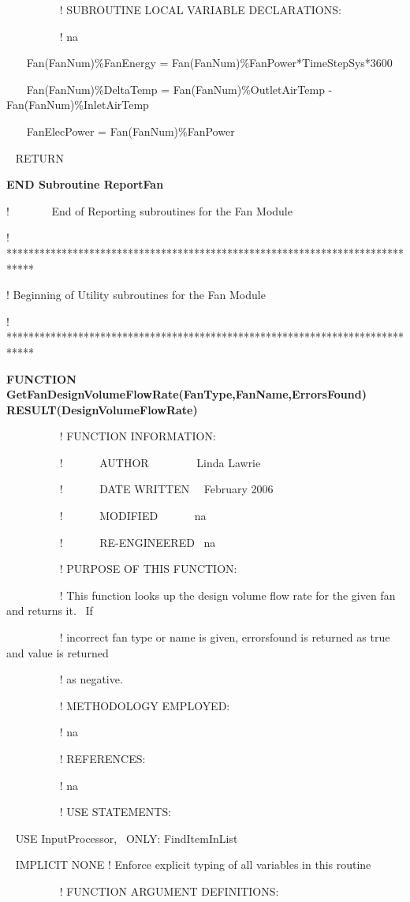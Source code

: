 ~~~~~~~~~ ! SUBROUTINE LOCAL VARIABLE DECLARATIONS:

~~~~~~~~~ ! na

~~~ Fan(FanNum)\%FanEnergy = Fan(FanNum)\%FanPower*TimeStepSys*3600

~~~ Fan(FanNum)\%DeltaTemp = Fan(FanNum)\%OutletAirTemp - Fan(FanNum)\%InletAirTemp

~~~ FanElecPower = Fan(FanNum)\%FanPower

~ RETURN

\textbf{END Subroutine ReportFan}

!~~~~~~~ End of Reporting subroutines for the Fan Module

! *****************************************************************************

! Beginning of Utility subroutines for the Fan Module

! *****************************************************************************

\textbf{FUNCTION GetFanDesignVolumeFlowRate(FanType,FanName,ErrorsFound) RESULT(DesignVolumeFlowRate)}

~~~~~~~~~ ! FUNCTION INFORMATION:

~~~~ ~~~~~!~~~~~~ AUTHOR~~~~~~~~ Linda Lawrie

~~~~~~~~~ !~~~~~~ DATE WRITTEN~~ February 2006

~~~~~~~~~ !~~~~~~ MODIFIED~~~~~~ na

~~~~~~~~~ !~~~~~~ RE-ENGINEERED~ na

~~~~~~~~~ ! PURPOSE OF THIS FUNCTION:

~~~~~~~~~ ! This function looks up the design volume flow rate for the given fan and returns it.~ If

~~~~~~~~~ ! incorrect fan type or name is given, errorsfound is returned as true and value is returned

~~~~~~~~~ ! as negative.

~~~~~~~~~ ! METHODOLOGY EMPLOYED:

~~~~~~~~~ ! na

~~~~~~~~~ ! REFERENCES:

~~~~~~~~ ~! na

~~~~~~~~~ ! USE STATEMENTS:

~ USE InputProcessor,~ ONLY: FindItemInList

~ IMPLICIT NONE ! Enforce explicit typing of all variables in this routine

~~~~~~~~~ ! FUNCTION ARGUMENT DEFINITIONS:

